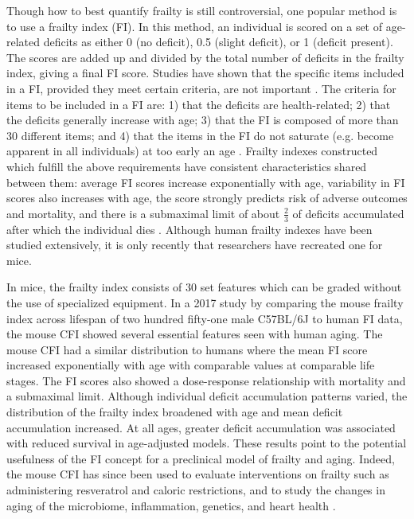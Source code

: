 \documentclass[11pt]{amsart}
\begin{document}
Though how to best quantify frailty is still controversial, one popular method is to use a frailty index (FI). In this method, an individual is scored on a set of age-related deficits as either 0 (no deficit), 0.5 (slight deficit), or 1 (deficit present). The scores are added up and divided by the total number of deficits in the frailty index, giving a final FI score. Studies have shown that the specific items included in a FI, provided they meet certain criteria, are not important \citep{rockwood2017frailty}. The criteria for items to be included in a FI are: 1) that the deficits are health-related; 2) that the deficits generally increase with age; 3) that the FI is composed of more than 30 different items; and 4) that the items in the FI do not saturate (e.g. become apparent in all individuals) at too early an age \citep{searle2008standard}. Frailty indexes constructed which fulfill the above requirements have consistent characteristics shared between them: average FI scores increase exponentially with age, variability in FI scores also increases with age, the score strongly predicts risk of adverse outcomes and mortality, and there is a submaximal limit of about $\frac{2}{3}$ of deficits accumulated after which the individual dies \citep{searle2008standard}. Although human frailty indexes have been studied extensively, it is only recently that researchers have recreated one for mice. 
 
In mice, the frailty index consists of 30 set features which can be graded without the use of specialized equipment. In a 2017 study by \citet{rockwood2017frailty} comparing the mouse frailty index across lifespan of two hundred fifty-one male C57BL/6J to human FI data, the mouse CFI showed several essential features seen with human aging. The mouse CFI had a similar distribution to humans where the mean FI score increased exponentially with age with comparable values at comparable life stages. The FI scores also showed a dose-response relationship with mortality and a submaximal limit. Although individual deficit accumulation patterns varied, the distribution of the frailty index broadened with age and mean deficit accumulation increased. At all ages, greater deficit accumulation was associated with reduced survival in age-adjusted models. These results point to the potential usefulness of the FI concept for a preclinical model of frailty and aging. Indeed, the mouse CFI has since been used to evaluate interventions on frailty such as administering resveratrol and caloric restrictions, and to study the changes in aging of the microbiome, inflammation, genetics, and heart health \citep{kane2017implementation}.
\end{document}
